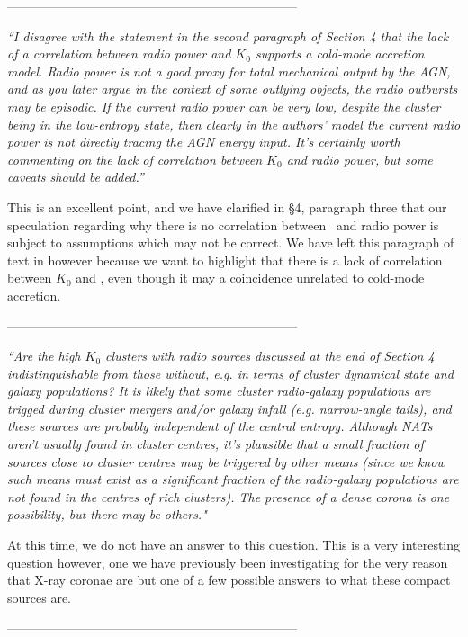 \documentclass[11pt]{article}
\begin{document}
---------------------------------------------------------------------

{\it{``I disagree with the statement in the second paragraph of
    Section 4 that the lack of a correlation between radio power and
    $K_0$ supports a cold-mode accretion model. Radio power is not a
    good proxy for total mechanical output by the AGN, and as you
    later argue in the context of some outlying objects, the radio
    outbursts may be episodic. If the current radio power can be very
    low, despite the cluster being in the low-entropy state, then
    clearly in the authors' model the current radio power is not
    directly tracing the AGN energy input. It's certainly worth
    commenting on the lack of correlation between $K_0$ and radio
    power, but some caveats should be added.''}}

This is an excellent point, and we have clarified in \S4, paragraph
three that our speculation regarding why there is no correlation
between \kna\ and radio power is subject to assumptions which may not
be correct. We have left this paragraph of text in however because we
want to highlight that there is a lack of correlation between $K_0$
and \radpow, even though it may a coincidence unrelated to cold-mode
accretion.

---------------------------------------------------------------------

{\it{``Are the high $K_0$ clusters with radio sources discussed at the
    end of Section 4 indistinguishable from those without, e.g. in
    terms of cluster dynamical state and galaxy populations? It is
    likely that some cluster radio-galaxy populations are trigged
    during cluster mergers and/or galaxy infall (e.g. narrow-angle
    tails), and these sources are probably independent of the central
    entropy. Although NATs aren't usually found in cluster centres,
    it's plausible that a small fraction of sources close to cluster
    centres may be triggered by other means (since we know such means
    must exist as a significant fraction of the radio-galaxy
    populations are not found in the centres of rich clusters). The
    presence of a dense corona is one possibility, but there may be
    others."}}

At this time, we do not have an answer to this question. This is a
very interesting question however, one we have previously been
investigating for the very reason that X-ray coronae are but one of a
few possible answers to what these compact sources are.

---------------------------------------------------------------------
\end{document}
